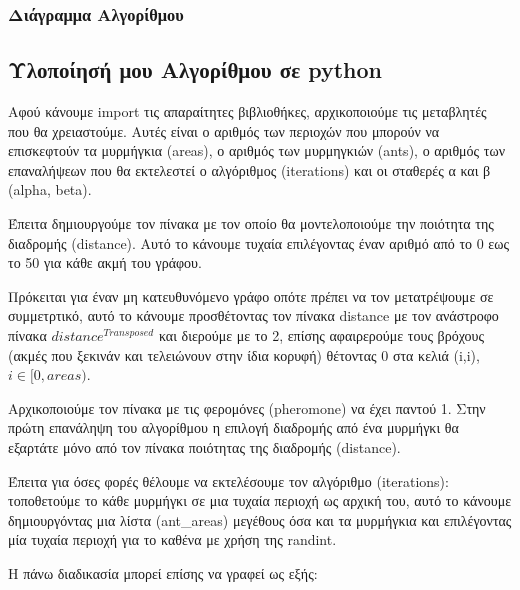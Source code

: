 \subsubsection{Διάγραμμα Αλγορίθμου}


\subsection{Υλοποίησή μου Αλγορίθμου σε python}
Αφού κάνουμε import τις απαραίτητες βιβλιοθήκες, αρχικοποιούμε τις μεταβλητές που θα χρειαστούμε. Αυτές είναι ο αριθμός των περιοχών που μπορούν να επισκεφτούν τα μυρμήγκια (areas), ο αριθμός των μυρμηγκιών (ants), ο αριθμός των επαναλήψεων που θα εκτελεστεί ο αλγόριθμος (iterations) και οι σταθερές α και β (alpha, beta).


Έπειτα δημιουργούμε τον πίνακα με τον οποίο θα μοντελοποιούμε την ποιότητα της διαδρομής (distance). Αυτό το κάνουμε τυχαία επιλέγοντας έναν αριθμό από το 0 εως το 50 για κάθε ακμή του γράφου.


Πρόκειται για έναν μη κατευθυνόμενο γράφο οπότε πρέπει να τον μετατρέψουμε σε συμμετρτικό, αυτό το κάνουμε προσθέτοντας τον πίνακα distance με τον ανάστροφο πίνακα $distance^{Transposed}$ και διερούμε με το 2, επίσης αφαιρερούμε τους βρόχους (ακμές που ξεκινάν και τελειώνουν στην ίδια κορυφή) θέτοντας 0 στα κελιά (i,i), $i\in[0,areas)$. \cite{perez2020introduction}


Αρχικοποιούμε τον πίνακα με τις φερομόνες (pheromone) να έχει παντού 1. Στην πρώτη επανάληψη του αλγορίθμου η επιλογή διαδρομής από ένα μυρμήγκι θα εξαρτάτε μόνο από τον πίνακα ποιότητας της διαδρομής (distance). 


Έπειτα για όσες φορές θέλουμε να εκτελέσουμε τον αλγόριθμο (iterations):
τοποθετούμε το κάθε μυρμήγκι σε μια τυχαία περιοχή ως αρχική του, αυτό το κάνουμε δημιουργόντας μια λίστα (ant\_areas) μεγέθους όσα και τα μυρμήγκια και επιλέγοντας μία τυχαία περιοχή για το καθένα με χρήση της randint. \cite{w3school}

Η πάνω διαδικασία μπορεί επίσης να γραφεί ως εξής: 


